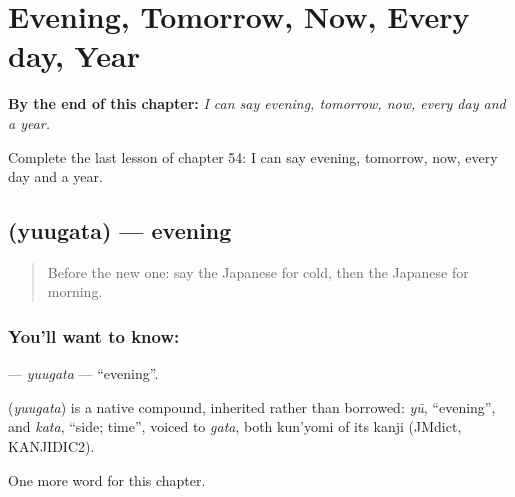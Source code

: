 
\chapter{Evening, Tomorrow, Now, Every day, Year}
\label{ch:ja-evening-tomorrow-now-every-day-year}

\begin{chapteropening}
\textbf{By the end of this chapter:} \emph{I can say evening, tomorrow, now, every day and a year.}

Complete the last lesson of chapter 54: I can say evening, tomorrow, now, every day and a year.
\end{chapteropening}

\section[\texorpdfstring{\ja{ゆうがた} (yuugata)}{ゆうがた (yuugata)}]{ (yuugata) — evening}

\label{lesson:JA-C54-yuugata}



\begin{quote}
Before the new one: say the Japanese for cold, then the Japanese for morning.
\end{quote}

\subsection*{You'll want to know: }
\textbf{} — \emph{yuugata} — \textquotedblleft{}evening\textquotedblright{}.

\begin{cousinweb}
\textbf{} (\emph{yuugata}) is a native compound, inherited rather than borrowed: \emph{yū}, \textquotedblleft{}evening\textquotedblright{}, and \emph{kata}, \textquotedblleft{}side; time\textquotedblright{}, voiced to \emph{gata}, both kun'yomi of its kanji (JMdict, KANJIDIC2).
\end{cousinweb}

\begin{grammarlens}[title={What you've built}]
One more word for this chapter.
\end{grammarlens}

